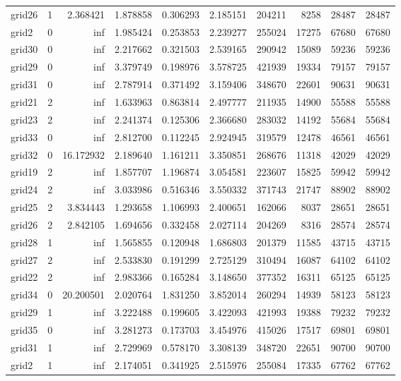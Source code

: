 \begin{longtable}{|l|r|r|r|r|r|r|r|r|r|}
grid26 & 1 & 2.368421 & 1.878858 & 0.306293 & 2.185151 & 204211 & 8258 & 28487 & 28487 \\
grid2 & 0 & inf & 1.985424 & 0.253853 & 2.239277 & 255024 & 17275 & 67680 & 67680 \\
grid30 & 0 & inf & 2.217662 & 0.321503 & 2.539165 & 290942 & 15089 & 59236 & 59236 \\
grid29 & 0 & inf & 3.379749 & 0.198976 & 3.578725 & 421939 & 19334 & 79157 & 79157 \\
grid31 & 0 & inf & 2.787914 & 0.371492 & 3.159406 & 348670 & 22601 & 90631 & 90631 \\
grid21 & 2 & inf & 1.633963 & 0.863814 & 2.497777 & 211935 & 14900 & 55588 & 55588 \\
grid23 & 2 & inf & 2.241374 & 0.125306 & 2.366680 & 283032 & 14192 & 55684 & 55684 \\
grid33 & 0 & inf & 2.812700 & 0.112245 & 2.924945 & 319579 & 12478 & 46561 & 46561 \\
grid32 & 0 & 16.172932 & 2.189640 & 1.161211 & 3.350851 & 268676 & 11318 & 42029 & 42029 \\
grid19 & 2 & inf & 1.857707 & 1.196874 & 3.054581 & 223607 & 15825 & 59942 & 59942 \\
grid24 & 2 & inf & 3.033986 & 0.516346 & 3.550332 & 371743 & 21747 & 88902 & 88902 \\
grid25 & 2 & 3.834443 & 1.293658 & 1.106993 & 2.400651 & 162066 & 8037 & 28651 & 28651 \\
grid26 & 2 & 2.842105 & 1.694656 & 0.332458 & 2.027114 & 204269 & 8316 & 28574 & 28574 \\
grid28 & 1 & inf & 1.565855 & 0.120948 & 1.686803 & 201379 & 11585 & 43715 & 43715 \\
grid27 & 2 & inf & 2.533830 & 0.191299 & 2.725129 & 310494 & 16087 & 64102 & 64102 \\
grid22 & 2 & inf & 2.983366 & 0.165284 & 3.148650 & 377352 & 16311 & 65125 & 65125 \\
grid34 & 0 & 20.200501 & 2.020764 & 1.831250 & 3.852014 & 260294 & 14939 & 58123 & 58123 \\
grid29 & 1 & inf & 3.222488 & 0.199605 & 3.422093 & 421993 & 19388 & 79232 & 79232 \\
grid35 & 0 & inf & 3.281273 & 0.173703 & 3.454976 & 415026 & 17517 & 69801 & 69801 \\
grid31 & 1 & inf & 2.729969 & 0.578170 & 3.308139 & 348720 & 22651 & 90700 & 90700 \\
grid2 & 1 & inf & 2.174051 & 0.341925 & 2.515976 & 255084 & 17335 & 67762 & 67762 \\

\end{longtable}
